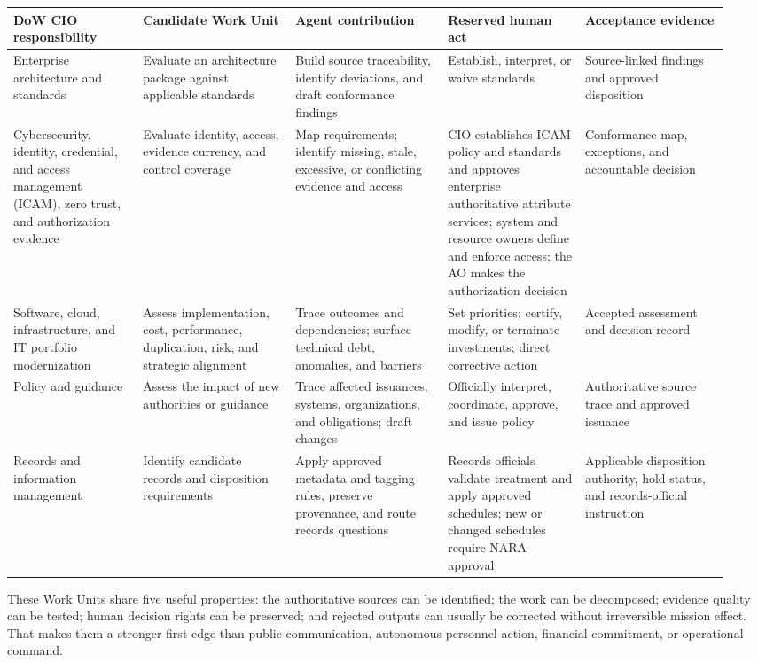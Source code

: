 \documentclass[11pt]{article}
\begin{document}
\begingroup\scriptsize\setlength{\tabcolsep}{2pt}\begin{longtable}{p{0.17\linewidth}p{0.20\linewidth}p{0.20\linewidth}p{0.18\linewidth}p{0.19\linewidth}}
\toprule\noalign{}
DoW CIO responsibility & Candidate Work Unit & Agent contribution &
Reserved human act & Acceptance evidence \\
\midrule\noalign{}
\endhead
\bottomrule\noalign{}
\endlastfoot
Enterprise architecture and standards & Evaluate an architecture package
against applicable standards & Build source traceability, identify
deviations, and draft conformance findings & Establish, interpret, or
waive standards & Source-linked findings and approved disposition \\
Cybersecurity, identity, credential, and access management (ICAM), zero
trust, and authorization evidence & Evaluate identity, access, evidence
currency, and control coverage & Map requirements; identify missing,
stale, excessive, or conflicting evidence and access & CIO establishes
ICAM policy and standards and approves enterprise authoritative
attribute services; system and resource owners define and enforce
access; the AO makes the authorization decision & Conformance map,
exceptions, and accountable decision \\
Software, cloud, infrastructure, and IT portfolio modernization & Assess
implementation, cost, performance, duplication, risk, and strategic
alignment & Trace outcomes and dependencies; surface technical debt,
anomalies, and barriers & Set priorities; certify, modify, or terminate
investments; direct corrective action & Accepted assessment and decision
record \\
Policy and guidance & Assess the impact of new authorities or guidance &
Trace affected issuances, systems, organizations, and obligations; draft
changes & Officially interpret, coordinate, approve, and issue policy &
Authoritative source trace and approved issuance \\
Records and information management & Identify candidate records and
disposition requirements & Apply approved metadata and tagging rules,
preserve provenance, and route records questions & Records officials
validate treatment and apply approved schedules; new or changed
schedules require NARA approval & Applicable disposition authority, hold
status, and records-official instruction \\
\end{longtable}\endgroup

These Work Units share five useful properties: the authoritative sources
can be identified; the work can be decomposed; evidence quality can be
tested; human decision rights can be preserved; and rejected outputs can
usually be corrected without irreversible mission effect. That makes
them a stronger first edge than public communication, autonomous
personnel action, financial commitment, or operational command.
\end{document}
